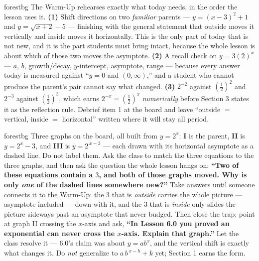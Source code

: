 \documentclass[10pt]{article}
\begin{document}
\begin{fixedskillbox}{forestbg}
    The Warm-Up rehearses exactly what today needs, in the order the lesson uses it. \textbf{(1)}
    Shift directions on two \emph{familiar} parents --- $y=(x-3)^{2}+1$ and $y=\sqrt{x+2}-5$ ---
    finishing with the general statement that outside moves it vertically and inside moves it
    horizontally. This is the only part of today that is not new, and it is the part students must
    bring intact, because the whole lesson is about which of those two moves the asymptote.
    \textbf{(2)} A recall check on $y=3(2)^{x}$ --- $a$, $b$, growth/decay, $y$-intercept, asymptote,
    range --- because every answer today is measured against ``$y=0$ and $(0,\infty)$,'' and a student
    who cannot produce the parent's pair cannot say what changed. \textbf{(3)} $2^{-2}$ against
    $\left(\frac12\right)^{2}$ and $2^{-3}$ against $\left(\frac12\right)^{3}$, which earns
    $2^{-x}=\left(\frac12\right)^{x}$ \emph{numerically} before Section 3 states it as the reflection
    rule. Debrief item 1 at the board and leave ``outside $=$ vertical, inside $=$ horizontal'' written
    where it will stay all period.
\end{fixedskillbox}

\begin{skillbox}[Hook]{forestbg}
    Three graphs on the board, all built from $y=2^{x}$: \textbf{I} is the parent, \textbf{II} is
    $y=2^{x}-3$, and \textbf{III} is $y=2^{\,x-3}$ --- each drawn with its horizontal asymptote as a
    dashed line. Do not label them. Ask the class to match the three equations to the three graphs,
    and then ask the question the whole lesson hangs on: \textbf{``Two of these equations contain a
    $3$, and both of those graphs moved. Why is only \emph{one} of the dashed lines somewhere new?''}
    Take answers until someone connects it to the Warm-Up: the $3$ that is \emph{outside} carries the
    whole picture --- asymptote included --- down with it, and the $3$ that is \emph{inside} only
    slides the picture sideways past an asymptote that never budged. Then close the trap: point at
    graph II crossing the $x$-axis and ask, \textbf{``In Lesson 6.0 you proved an exponential can
    never cross the $x$-axis. Explain that graph.''} Let the class resolve it --- 6.0's claim was
    about $y=ab^{x}$, and the vertical shift is exactly what changes it. Do \emph{not} generalize to
    $a\,b^{\,x-h}+k$ yet; Section 1 earns the form.
\end{skillbox}
\end{document}
